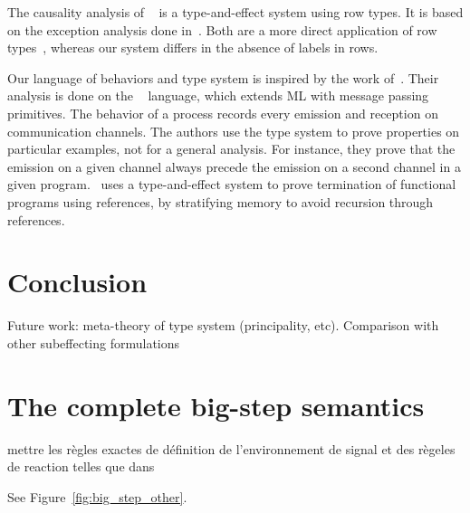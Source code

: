 \documentclass[9pt,preprint]{sigplanconf}
\newcommand{\todo}[1]{ {\color{red} #1}}
\begin{document}
The causality analysis of \lucy~\cite{Cuoq:2001} is a type-and-effect system using row types. It is based on the exception analysis done in~\cite{Leroy:2000}. Both are a more direct application of row types~\cite{Remy:1993}, whereas our system differs in the absence of labels in rows.


Our language of behaviors and type system is inspired by the work of~\cite{Amtoft:1999}. Their analysis is done on the \cml~\cite{Reppy:2007} language, which extends ML with message passing primitives. The behavior of a process records every emission and reception on communication channels. The authors use the type system to prove properties on particular examples, not for a general analysis. For instance, they prove that the emission on a given channel always precede the emission on a second channel in a given program. \cite{Boudol:2010}~uses a type-and-effect system to prove termination of functional programs using references, by stratifying memory to avoid recursion through references.


\section{Conclusion}

Future work: meta-theory of type system (principality, etc). Comparison with other subeffecting formulations



\begin{small}

\end{small}

\clearpage

\begin{figure*}[t]


\caption{Remaining rules for the big-step semantics}
\label{fig:big_step_other}
\end{figure*}



\appendix

\section{The complete big-step semantics}
\label{sec:big_step_other}

\todo{mettre les règles exactes de définition de l'environnement de signal et des règeles de reaction telles que dans \cite{Mandel:2005}}

See Figure~\ref{fig:big_step_other}.
\end{document}
